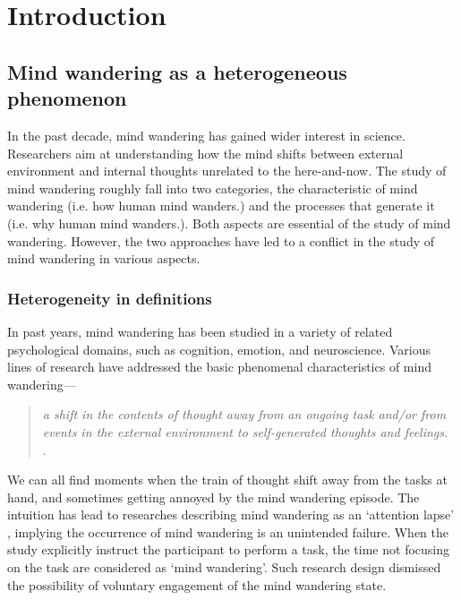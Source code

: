 \chapter{Introduction}
\label{ch:intro}

\newpage
\section{Mind wandering as a heterogeneous phenomenon}
In the past decade, mind wandering has gained wider interest in science. Researchers aim at understanding how the mind shifts between external environment and internal thoughts unrelated to the here-and-now. The study of mind wandering roughly fall into two categories, the characteristic of mind wandering (i.e. how human mind wanders.) and the processes that generate it (i.e. why human mind wanders.). Both aspects are essential of the study of mind wandering. However, the two approaches have led to a conflict in the study of mind wandering in various aspects. 

\subsection{Heterogeneity in definitions}
In past years, mind wandering has been studied in a variety of related psychological domains, such as cognition, emotion, and neuroscience. Various lines of research have addressed the basic phenomenal characteristics of mind wandering---
\begin{quote}
    \textit{a shift in the contents of thought away from an ongoing task and/or from events in the external environment to self-generated thoughts and feelings.}\\    
    \cite{SmallwoodSchooler2006,SmallwoodSchooler2015}.
\end{quote}
We can all find moments when the train of thought shift away from the tasks at hand, and sometimes getting annoyed by the mind wandering episode. The intuition has lead to researches describing mind wandering as an `attention lapse' \cite{McVayJOEP2009, McVay2012}, implying the occurrence of mind wandering is an unintended failure. When the study explicitly instruct the participant to perform a task, the time not focusing on the task are considered as `mind wandering'. Such research design dismissed the possibility of voluntary engagement of the mind wandering state. 

